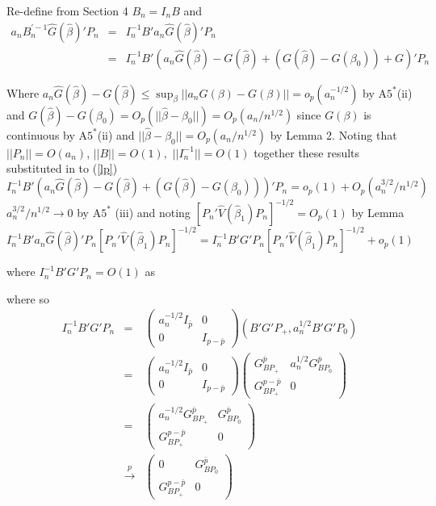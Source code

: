 \documentclass[11pt, fleqn]{article}
\begin{document}
Re-define from Section 4 $B_n=I_nB$ and 
\begin{eqnarray}
a_nB_n^{'-1}\hat{G}(\hat{\beta})'P_n
&=& I_n^{-1}B'a_n\hat{G}(\hat{\beta})'P_n\\
&=&I_n^{-1}B'\left(a_n\hat{G}(\hat{\beta})-G(\hat{\beta}) +(G(\hat{\beta})-G(\beta_0))+G\right)'P_n \label{lp}
\end{eqnarray}

Where $a_n\hat{G}(\hat{\beta})-G(\hat{\beta})\leq \sup_{\beta}|\!|a_n\hat{G}(\beta)-G(\beta)|\!|=o_p(a_n^{-1/2})$ by A$5^*$(ii) and $G(\hat{\beta})-G(\beta_0)=O_p(|\!|\hat{\beta}-\beta_0|\!|)=O_p(a_n/n^{1/2})$ since $G(\beta)$ is continuous by A$5^*$(ii) and $|\!|\hat{\beta}-\beta_0|\!|=O_p(a_n/n^{1/2})$ by Lemma 2. Noting that $|\!|P_n|\!|=O(a_n)$, $|\!|B|\!|=O(1),$ $|\!|I_n^{-1}|\!|=O(1)$ together these results substituted in to (\ref{lp})
\begin{equation}
I_n^{-1}B'\left(a_n\hat{G}(\hat{\beta})-G(\hat{\beta}) +(G(\hat{\beta})-G(\beta_0))\right)'P_n=o_p(1)+O_p(a_n^{3/2}/n^{1/2})
\end{equation}
$a_n^{3/2}/n^{1/2}\rightarrow 0$ by A$5^*$ (iii) and noting $\left[P_n'\hat{V}(\hat{\beta}_1)P_n\right]^{-1/2}=O_p(1)$ by Lemma 
\begin{equation}
I_n^{-1}B'a_n\hat{G}(\hat{\beta})'P_n\left[P_n'\hat{V}(\hat{\beta}_1)P_n\right]^{-1/2}=I_n^{-1}B'G'P_n\left[P_n'\hat{V}(\hat{\beta}_1)P_n\right]^{-1/2} +o_p(1)
\end{equation}




where   $I_n^{-1}B'G'P_n=O(1)$ as



where  so
\begin{eqnarray}
I_n^{-1}B'G'P_n 
&=&\left(\begin{array}{cc} a_n^{-1/2}I_{\bar{p}} & 0\\ 0 & I_{p-\bar{p}}\end{array}\right)\left(B'G'P_+, a_n^{1/2}B'G'P_0\right) \\
&=&\left(\begin{array}{cc} a_n^{-1/2}I_{\bar{p}} & 0\\ 0 & I_{p-\bar{p}}\end{array}\right) \left( \begin{array}{cc} G_{BP_+}^{\bar{p}}& a_n^{1/2} G_{BP_0}^{\bar{p}}\\
G_{BP_+}^{p-\bar{p}} & 0
 \end{array} \right) \\
 &=&  \left(\begin{array}{cc} a_n^{-1/2}G_{BP_+}^{\bar{p}} &  G_{BP_0}^{\bar{p}}\\
  G_{BP_+}^{p-\bar{p}}& 0
 \end{array} \right)\\ 
  &\overset{p}{\rightarrow}&
  \left(\begin{array}{cc} 0 &  G_{BP_0}^{\bar{p}}\\
  G_{BP_+}^{p-\bar{p}}& 0
  \end{array} \right)  
\end{eqnarray}
\end{document}
